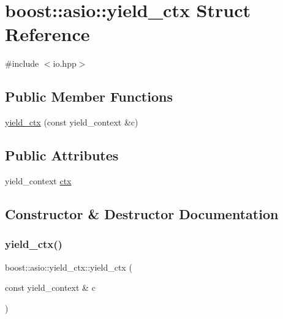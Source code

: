 \hypertarget{structboost_1_1asio_1_1yield__ctx}{}\section{boost\+:\+:asio\+:\+:yield\+\_\+ctx Struct Reference}
\label{structboost_1_1asio_1_1yield__ctx}


{\ttfamily \#include $<$io.\+hpp$>$}

\subsection*{Public Member Functions}
\begin{DoxyCompactItemize}
\item 
\hyperlink{structboost_1_1asio_1_1yield__ctx_acf48f3c8fcfba5659778c954ef648c99}{yield\+\_\+ctx} (const yield\+\_\+context \&c)
\end{DoxyCompactItemize}
\subsection*{Public Attributes}
\begin{DoxyCompactItemize}
\item 
yield\+\_\+context \hyperlink{structboost_1_1asio_1_1yield__ctx_a7957d3a6e8bc2818d5548c549d2a7bc6}{ctx}
\end{DoxyCompactItemize}


\subsection{Constructor \& Destructor Documentation}
\mbox{\label{structboost_1_1asio_1_1yield__ctx_acf48f3c8fcfba5659778c954ef648c99}} 
\subsubsection{\texorpdfstring{yield\+\_\+ctx()}{yield\_ctx()}}
{\footnotesize\ttfamily boost\+::asio\+::yield\+\_\+ctx\+::yield\+\_\+ctx (\begin{DoxyParamCaption}\item[{const yield\+\_\+context \&}]{c }\end{DoxyParamCaption})\hspace{0.3cm}{\ttfamily [inline]}}



